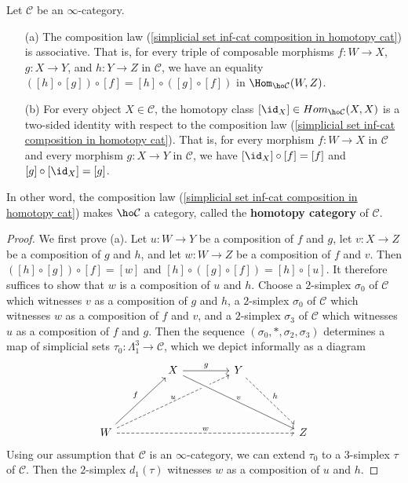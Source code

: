 \begin{proposition}\label{simplicial set inf-cat homotopy cat def}
Let $\mathcal{C}$ be an $\infty$-category.
\begin{itemize}
\item[(a)] The composition law (\ref{simplicial set inf-cat composition in homotopy cat}) is associative. That is, for every triple of composable morphisms $f:W\to X$, $g:X\to Y$, and $h:Y\to Z$ in $\mathcal{C}$, we have an equality $([h]\circ[g])\circ[f]=[h]\circ([g]\circ[f])$ in $\Hom_{\ho\mathcal{C}}(W,Z)$.
\item[(b)] For every object $X\in\mathcal{C}$, the homotopy class $[\id_X]\in Hom_{\ho\mathcal{C}}(X,X)$ is a two-sided identity with respect to the composition law (\ref{simplicial set inf-cat composition in homotopy cat}). That is, for every morphism $f:W\to X$ in $\mathcal{C}$ and every morphism $g:X\to Y$ in $\mathcal{C}$, we have $[\id_X]\circ[f]=[f]$ and $[g]\circ[\id_X]=[g]$.
\end{itemize}
In other word, the composition law (\ref{simplicial set inf-cat composition in homotopy cat}) makes $\ho\mathcal{C}$ a category, called the \textbf{homotopy category} of $\mathcal{C}$.
\end{proposition}
\begin{proof}
We first prove (a). Let $u:W\to Y$ be a composition of $f$ and $g$, let $v:X\to Z$ be a composition of $g$ and $h$, and let $w:W\to Z$ be a composition of $f$ and $v$. Then $([h]\circ[g])\circ[f]=[w]$ and $[h]\circ([g]\circ[f])=[h]\circ[u]$. It therefore suffices to show that $w$ is a composition of $u$ and $h$. Choose a $2$-simplex $\sigma_0$ of $\mathcal{C}$ which witnesses $v$ as a composition of $g$ and $h$, a $2$-simplex $\sigma_0$ of $\mathcal{C}$ which witnesses $w$ as a composition of $f$ and $v$, and a $2$-simplex $\sigma_3$ of $\mathcal{C}$ which witnesses $u$ as a composition of $f$ and $g$. Then the sequence $(\sigma_0,\ast,\sigma_2,\sigma_3)$ determines a map of simplicial sets $\tau_0:\Lambda_1^3\to\mathcal{C}$, which we depict informally as a diagram
\[\begin{tikzcd}[row sep=15mm,column sep=15mm]
&X\ar[r,"g"]&Y\ar[rd,dashed,"h"]&\\
W\ar[ru,"f"]\ar[rru,dashed,"u"{anchor=south}]\ar[rrr,dashed,"w"]&&&Z\ar[llu,crossing over,leftarrow,swap,"v"{anchor=south}]
\end{tikzcd}\]
Using our assumption that $\mathcal{C}$ is an $\infty$-category, we can extend $\tau_0$ to a $3$-simplex $\tau$ of $\mathcal{C}$. Then the $2$-simplex $d_1(\tau)$ witnesses $w$ as a composition of $u$ and $h$.
\end{proof}
